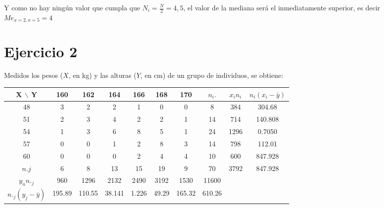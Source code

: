 \documentclass[a4paper,12pt]{article}
\begin{document}
Y como no hay ningún valor que cumpla que $N_i = \frac{N}{2} = 4,5$, el valor de la mediana será el inmediatamente superior, es decir $Me_{x =2, x=5}=4$ 

\section*{Ejercicio 2}
Medidos los pesos ($X$, en kg) y las alturas ($Y$, en cm) de un grupo de individuos, se obtiene:

\begin{center}
\begin{tabular}{c|cccccc|ccc}
X $\backslash$ Y & 160 & 162 & 164 & 166 & 168 & 170 & $n_i.$ & $x_in_i$ & $n_i(x_i- \bar y)$ \\
\hline
48 & 3 & 2 & 2 & 1 & 0 & 0 & 8 & 384 & 304.68 \\
51 & 2 & 3 & 4 & 2 & 2 & 1 & 14 & 714 & 140.808\\
54 & 1 & 3 & 6 & 8 & 5 & 1 & 24 & 1296 & 0.7050\\
57 & 0 & 0 & 1 & 2 & 8 & 3 & 14 & 798 & 112.01\\
60 & 0 & 0 & 0 & 2 & 4 & 4 & 10 & 600 & 847.928\\
\hline
$n.j$ & 6 & 8 & 13 & 15 & 19 & 9 & 70 & 3792 & 847.928\\
$y_nn._j$ & 960 & 1296 & 2132 & 2490 & 3192 & 1530 & 11600\\
$n._j(y_j-\bar y)$ & 195.89 & 110.55 & 38.141 & 1.226 & 49.29 & 165.32 & 610.26\\
\end{tabular}
\end{center}
\end{document}
